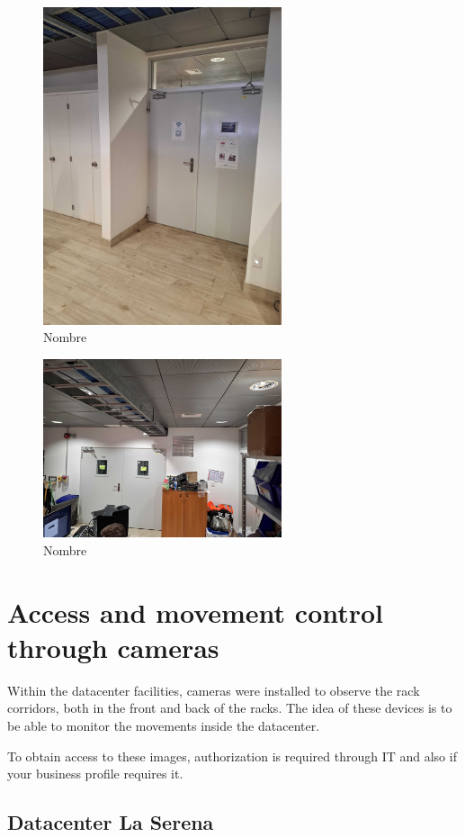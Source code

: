 \begin{figure}
    \includegraphics[width=7cm]{20.jpg}
    \centering
    \caption*{Nombre}
  \end{figure}
  \begin{figure}
    \includegraphics[width=7cm]{21.jpg}
    \centering
    \caption*{Nombre}
  \end{figure}

\section{Access and movement control through cameras}

Within the datacenter facilities, cameras were installed to observe the rack corridors, both in the front and back of the racks. The idea of these devices is to be able to monitor the movements inside the datacenter.

To obtain access to these images, authorization is required through IT and also if your business profile requires it.

\subsection{Datacenter La Serena}

